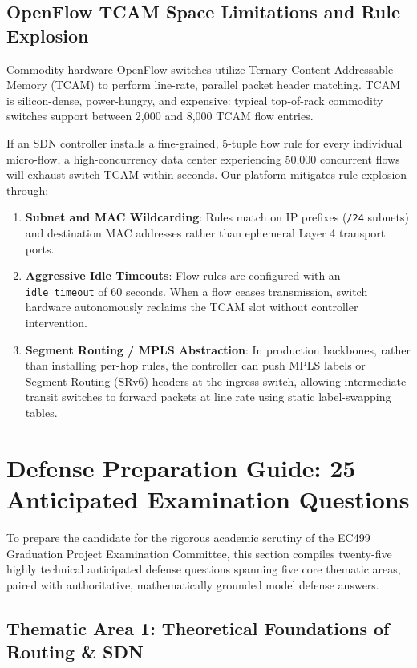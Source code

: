 \subsection{OpenFlow TCAM Space Limitations and Rule Explosion}
Commodity hardware OpenFlow switches utilize Ternary Content-Addressable Memory (TCAM) to perform line-rate, parallel packet header matching. TCAM is silicon-dense, power-hungry, and expensive: typical top-of-rack commodity switches support between 2,000 and 8,000 TCAM flow entries.

If an SDN controller installs a fine-grained, 5-tuple flow rule for every individual micro-flow, a high-concurrency data center experiencing 50,000 concurrent flows will exhaust switch TCAM within seconds. Our platform mitigates rule explosion through:
\begin{enumerate}
    \item \textbf{Subnet and MAC Wildcarding}: Rules match on IP prefixes (\texttt{/24} subnets) and destination MAC addresses rather than ephemeral Layer 4 transport ports.
    \item \textbf{Aggressive Idle Timeouts}: Flow rules are configured with an \texttt{idle\_timeout} of 60 seconds. When a flow ceases transmission, switch hardware autonomously reclaims the TCAM slot without controller intervention.
    \item \textbf{Segment Routing / MPLS Abstraction}: In production backbones, rather than installing per-hop rules, the controller can push MPLS labels or Segment Routing (SRv6) headers at the ingress switch, allowing intermediate transit switches to forward packets at line rate using static label-swapping tables.
\end{enumerate}

\section{Defense Preparation Guide: 25 Anticipated Examination Questions}
To prepare the candidate for the rigorous academic scrutiny of the EC499 Graduation Project Examination Committee, this section compiles twenty-five highly technical anticipated defense questions spanning five core thematic areas, paired with authoritative, mathematically grounded model defense answers.

\subsection{Thematic Area 1: Theoretical Foundations of Routing \& SDN}

